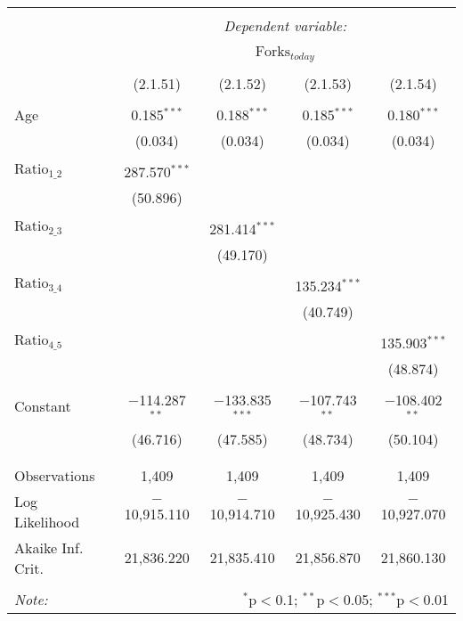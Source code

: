 
\begin{tabular}{@{\extracolsep{5pt}}lcccc}
\\[-1.8ex]\hline
\hline \\[-1.8ex]
 & \multicolumn{4}{c}{\textit{Dependent variable:}} \\
\cline{2-5}
\\[-1.8ex] & \multicolumn{4}{c}{$\text{Forks}_{today}$} \\
\\[-1.8ex] & (2.1.51) & (2.1.52) & (2.1.53) & (2.1.54)\\ 
\hline \\[-1.8ex]
 Age & 0.185$^{***}$ & 0.188$^{***}$ & 0.185$^{***}$ & 0.180$^{***}$ \\
  & (0.034) & (0.034) & (0.034) & (0.034) \\
  & & & & \\
 $\text{Ratio}_{1\_2}$ & 287.570$^{***}$ &  &  &  \\
  & (50.896) &  &  &  \\
  & & & & \\
 $\text{Ratio}_{2\_3}$ &  & 281.414$^{***}$ &  &  \\
  &  & (49.170) &  &  \\
  & & & & \\
 $\text{Ratio}_{3\_4}$ &  &  & 135.234$^{***}$ &  \\
  &  &  & (40.749) &  \\
  & & & & \\
 $\text{Ratio}_{4\_5}$ &  &  &  & 135.903$^{***}$ \\
  &  &  &  & (48.874) \\
  & & & & \\
 Constant & $-$114.287$^{**}$ & $-$133.835$^{***}$ & $-$107.743$^{**}$ & $-$108.402$^{**}$ \\
  & (46.716) & (47.585) & (48.734) & (50.104) \\
  & & & & \\
\hline \\[-1.8ex]
Observations & 1,409 & 1,409 & 1,409 & 1,409 \\
Log Likelihood & $-$10,915.110 & $-$10,914.710 & $-$10,925.430 & $-$10,927.070 \\
Akaike Inf. Crit. & 21,836.220 & 21,835.410 & 21,856.870 & 21,860.130 \\
\hline
\hline \\[-1.8ex]
\textit{Note:}  & \multicolumn{4}{r}{$^{*}$p$<$0.1; $^{**}$p$<$0.05; $^{***}$p$<$0.01} \\
\end{tabular}
